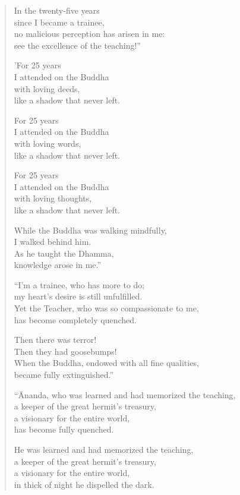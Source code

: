 \documentclass[12pt,openany]{book}%
\begin{document}
\begin{verse}
In the twenty-five years \\
since I became a trainee, \\
no malicious perception has arisen in me: \\
see the excellence of the teaching!” 

'For 25 years \\
I attended on the Buddha \\
with loving deeds, \\
like a shadow that never left. 

For 25 years \\
I attended on the Buddha \\
with loving words, \\
like a shadow that never left. 

For 25 years \\
I attended on the Buddha \\
with loving thoughts, \\
like a shadow that never left. 

While the Buddha was walking mindfully, \\
I walked behind him. \\
As he taught the Dhamma, \\
knowledge arose in me.” 

“I’m a trainee, who has more to do; \\
my heart’s desire is still unfulfilled. \\
Yet the Teacher, who was so compassionate to me, \\
has become completely quenched. 

Then there was terror! \\
Then they had goosebumps! \\
When the Buddha, endowed with all fine qualities, \\
became fully extinguished.” 

“Ānanda, who was learned and had memorized the teaching, \\
a keeper of the great hermit’s treasury, \\
a visionary for the entire world, \\
has become fully quenched. 

He was learned and had memorized the teaching, \\
a keeper of the great hermit’s treasury, \\
a visionary for the entire world, \\
in thick of night he dispelled the dark. 


\end{verse}
\end{document}
